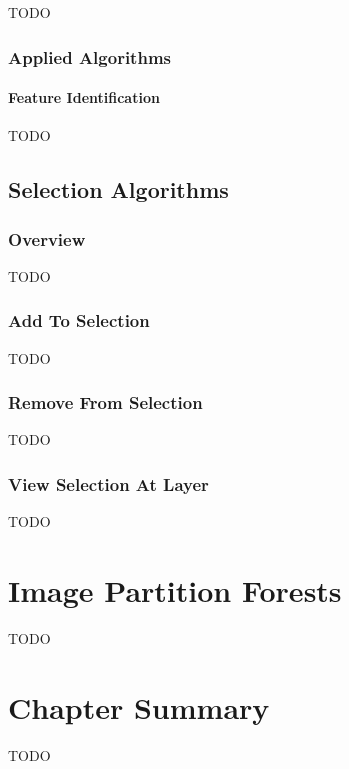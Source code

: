 TODO

\subsubsection{Applied Algorithms}

\paragraph{Feature Identification}

TODO

\subsection{Selection Algorithms}

\subsubsection{Overview}

TODO

\subsubsection{Add To Selection}

TODO

\subsubsection{Remove From Selection}

TODO

\subsubsection{View Selection At Layer}

TODO

\section{Image Partition Forests}

TODO

\section{Chapter Summary}

TODO
